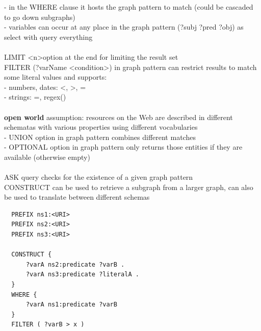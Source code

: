 - in the WHERE clause it hosts the graph pattern to match (could be cascaded to go down subgraphs) \\
- variables can occur at any place in the graph pattern (?subj ?pred ?obj) as select with query everything \\
\\
LIMIT \textless n\textgreater option at the end for limiting the result set \\
FILTER (?varName \textless condition\textgreater ) in graph pattern can restrict results to match some
literal values and supports: \\
- numbers, dates: \textless, \textgreater, = \\
- strings: =, regex() \\
\\
\textbf{open world} assumption: resources on the Web are described in different schematas with various properties
using different vocabularies \\
- UNION option in graph pattern combines different matches \\
- OPTIONAL option in graph pattern only returns those entities if they are available (otherwise empty) \\
\\
ASK query checks for the existence of a given graph pattern \\
CONSTRUCT can be used to retrieve a subgraph from a larger graph, can also be used to translate between different schemas \\
\begin{verbatim}
  PREFIX ns1:<URI>
  PREFIX ns2:<URI>
  PREFIX ns3:<URI>

  CONSTRUCT {
      ?varA ns2:predicate ?varB .
      ?varA ns3:predicate ?literalA .
  }
  WHERE {
      ?varA ns1:predicate ?varB
  }
  FILTER ( ?varB > x )
\end{verbatim}

